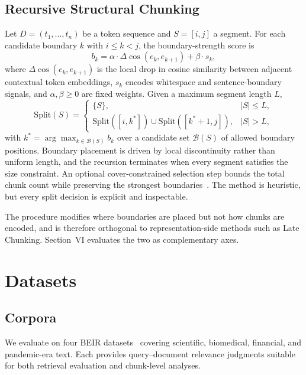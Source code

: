 \subsection{Recursive Structural Chunking}
\label{sec:method_recur}
Let $D=(t_1,\dots,t_n)$ be a token sequence and $S=[i,j]$ a segment. For each candidate boundary $k$ with $i \le k < j$, the boundary-strength score is
\[
b_k = \alpha \cdot \Delta\!\cos(e_{k},e_{k+1}) + \beta \cdot s_k,
\]
where $\Delta\!\cos(e_k, e_{k+1})$ is the local drop in cosine similarity between adjacent contextual token embeddings, $s_k$ encodes whitespace and sentence-boundary signals, and $\alpha, \beta \ge 0$ are fixed weights. Given a maximum segment length $L$,
\[
\mathrm{Split}(S)=
\begin{cases}
\{S\}, & |S| \le L, \\
\mathrm{Split}([i,k^*]) \cup \mathrm{Split}([k^*+1,j]), & |S| > L,
\end{cases}
\]
with $k^*=\arg\max_{k \in \mathcal{B}(S)} b_k$ over a candidate set $\mathcal{B}(S)$ of allowed boundary positions. Boundary placement is driven by local discontinuity rather than uniform length, and the recursion terminates when every segment satisfies the size constraint. An optional cover-constrained selection step bounds the total chunk count while preserving the strongest boundaries~\cite{lu2025hichunk}. The method is heuristic, but every split decision is explicit and inspectable.

The procedure modifies where boundaries are placed but not how chunks are encoded, and is therefore orthogonal to representation-side methods such as Late Chunking. Section~VI evaluates the two as complementary axes.

\section{Datasets}
\subsection{Corpora}
We evaluate on four BEIR datasets~\cite{thakur2021beir} covering scientific, biomedical, financial, and pandemic-era text. Each provides query--document relevance judgments suitable for both retrieval evaluation and chunk-level analyses.

